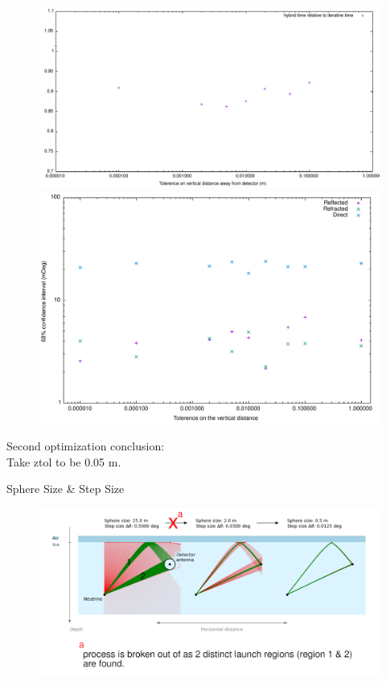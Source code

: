 \documentclass{beamer}
\begin{document}
\begin{frame}
	\begin{figure}
		\begin{minipage}{\textwidth}
			\centering
			\includegraphics[height=0.45\textheight]{figures/ZtolVsTime2.pdf}
		\end{minipage}
		\begin{minipage}{\textwidth}
			\centering
			\includegraphics[height=0.45\textheight]{figures/ZtolVsSigmaAZ.pdf}
		\end{minipage}
	\end{figure}
\end{frame}
\begin{frame}
	Second optimization conclusion:\\ Take ztol to be 0.05 m.
\end{frame}
\begin{frame}{Sphere Size \& Step Size}
	\begin{figure}
		\includegraphics[width=\textwidth]{figures/explanation.png}
	\end{figure}
\end{frame}
\end{document}
